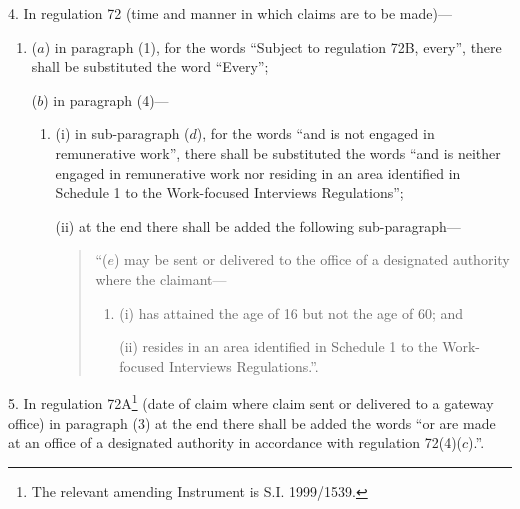 \documentclass[12pt,a4paper]{article}
\begin{document}
\medskip

4.  In regulation 72 (time and manner in which claims are to be made)—
\begin{enumerate}\item[]
($a$) in paragraph (1), for the words “Subject to regulation 72B, every”, there shall be substituted the word “Every”;

($b$) in paragraph (4)—
\begin{enumerate}\item[]
(i) in sub-paragraph ($d$), for the words “and is not engaged in remunerative work”, there shall be substituted the words “and is neither engaged in remunerative work nor residing in an area identified in Schedule 1 to the Work-focused Interviews Regulations”;

(ii) at the end there shall be added the following sub-paragraph—
\begin{quotation}
“($e$) may be sent or delivered to the office of a designated authority where the claimant—
\begin{enumerate}\item[]
(i) has attained the age of 16 but not the age of 60; and

(ii) resides in an area identified in Schedule 1 to the Work-focused Interviews Regulations.”.
\end{enumerate}
\end{quotation}
\end{enumerate}
\end{enumerate}

\medskip

5.  In regulation 72A\footnote{\frenchspacing The relevant amending Instrument is S.I. 1999/1539.} (date of claim where claim sent or delivered to a gateway office) in paragraph (3) at the end there shall be added the words “or are made at an office of a designated authority in accordance with regulation 72(4)($c$).”.

\medskip
\end{document}
